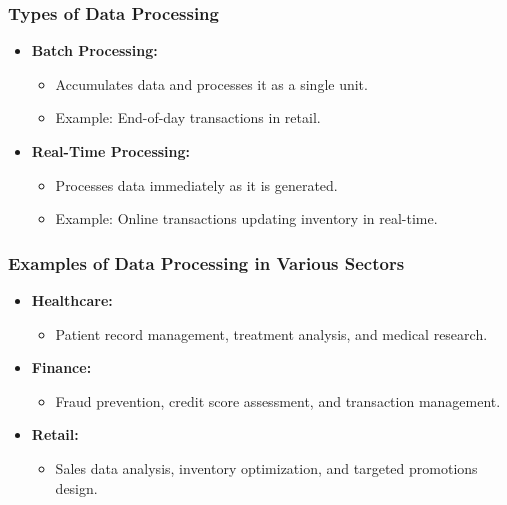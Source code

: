 \documentclass[aspectratio=169]{beamer}
\begin{document}
\begin{frame}[fragile]
    \frametitle{Types of Data Processing}
    \begin{itemize}
        \item \textbf{Batch Processing:} 
            \begin{itemize}
                \item Accumulates data and processes it as a single unit.
                \item Example: End-of-day transactions in retail.
            \end{itemize}

        \item \textbf{Real-Time Processing:} 
            \begin{itemize}
                \item Processes data immediately as it is generated.
                \item Example: Online transactions updating inventory in real-time.
            \end{itemize}
    \end{itemize}
\end{frame}

\begin{frame}[fragile]
    \frametitle{Examples of Data Processing in Various Sectors}
    \begin{itemize}
        \item \textbf{Healthcare:} 
            \begin{itemize}
                \item Patient record management, treatment analysis, and medical research.
            \end{itemize}
        \item \textbf{Finance:} 
            \begin{itemize}
                \item Fraud prevention, credit score assessment, and transaction management.
            \end{itemize}
        \item \textbf{Retail:} 
            \begin{itemize}
                \item Sales data analysis, inventory optimization, and targeted promotions design.
            \end{itemize}
    \end{itemize}
\end{frame}
\end{document}

